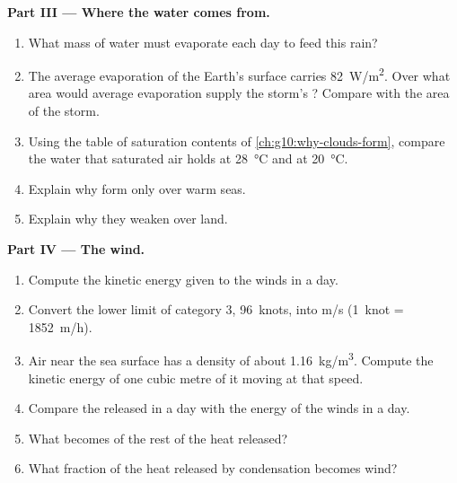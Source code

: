\begin{problem}
\medskip
\noindent\textbf{Part III --- Where the water comes from.}
\begin{enumerate}[resume]
  \item What mass of water must evaporate each day to feed this rain?
  \item The average evaporation of the Earth's surface carries
        \qty{82}{W/m^2}. Over what area would average evaporation supply the
        storm's ? Compare with the area of the storm.
  \item Using the table of saturation contents of
        \cref{ch:g10:why-clouds-form}, compare the water that saturated air
        holds at \qty{28}{\degreeCelsius} and at \qty{20}{\degreeCelsius}.
  \item Explain why  form only over warm seas.
  \item Explain why they weaken over land.
\end{enumerate}

\medskip
\noindent\textbf{Part IV --- The wind.}
\begin{enumerate}[resume]
  \item Compute the kinetic energy given to the winds in a day.
  \item Convert the lower limit of category 3, \num{96}~knots, into
        \unit{m/s} (\num{1}~knot = \qty{1852}{m/h}).
  \item Air near the sea surface has a density of about
        \qty{1.16}{kg/m^3}. Compute the kinetic energy of one cubic metre of
        it moving at that speed.
  \item Compare the  released in a day with the energy of the
        winds in a day.
  \item What becomes of the rest of the heat released?
  \item What fraction of the heat released by condensation becomes wind?
\end{enumerate}
\end{problem}
